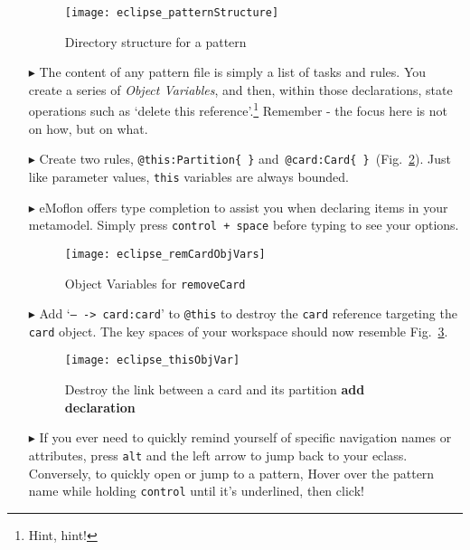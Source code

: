 \begin{itemize}
\begin{figure}[htp]
\begin{center}
  \texttt{[image: eclipse\_patternStructure]}
  \caption{Directory structure for a pattern}
  \label{fig:pattStruct}
\end{center}
\end{figure}

\item[$\blacktriangleright$] The content of any pattern file is simply a list of tasks and rules. You create a series of \emph{Object Variables}, and then,
within those declarations, state operations such as `delete this reference'.\footnote{Hint, hint!} Remember - the focus here is not on how, but on what.

\item[$\blacktriangleright$] Create two rules, \texttt{@this:Partition\{ \}} and~\texttt{@card:Card\{ \}}~(Fig.~\ref{fig:remCardObjVar}). Just like parameter
values, \texttt{this} variables are always bounded.

\item[$\blacktriangleright$] eMoflon offers type completion to assist you when declaring items in your metamodel. Simply press \texttt{control + space} before
typing to see your options.

\begin{figure}[htp]
\begin{center}
  \texttt{[image: eclipse\_remCardObjVars]}
  \caption{Object Variables for \texttt{removeCard}}
  \label{fig:remCardObjVar}
\end{center}
\end{figure}

\clearpage

\item[$\blacktriangleright$] Add `\texttt{-- -> card:card}' to \texttt{@this} to destroy the \texttt{card} reference targeting the \texttt{card} object. The key
spaces of your workspace should now resemble Fig.~\ref{fig:deleteReference}.

\begin{figure}[htp]
\begin{center}
  \texttt{[image: eclipse\_thisObjVar]}
  \caption{Destroy the link between a card and its partition {\bf add declaration}}
  \label{fig:deleteReference}
\end{center}
\end{figure}

\item[$\blacktriangleright$] If you ever need to quickly remind yourself of specific navigation names or attributes, press \texttt{alt} and the left arrow to
jump back to your eclass. Conversely, to quickly open or jump to a pattern, Hover over the pattern name while holding \texttt{control} until it's underlined, then click!


\end{itemize}
